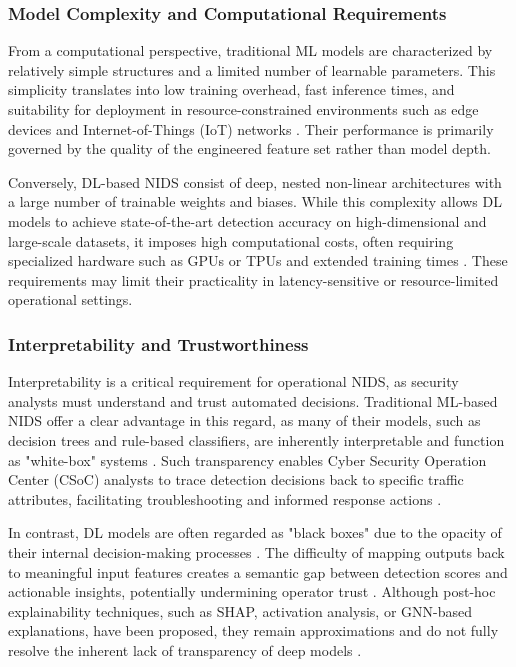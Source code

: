 \subsubsection{Model Complexity and Computational Requirements}

From a computational perspective, traditional ML models are characterized by relatively simple structures and a limited number of learnable parameters. This simplicity translates into low training overhead, fast inference times, and suitability for deployment in resource-constrained environments such as edge devices and Internet-of-Things (IoT) networks \cite{md2025guardians}. Their performance is primarily governed by the quality of the engineered feature set rather than model depth.

Conversely, DL-based NIDS consist of deep, nested non-linear architectures with a large number of trainable weights and biases. While this complexity allows DL models to achieve state-of-the-art detection accuracy on high-dimensional and large-scale datasets, it imposes high computational costs, often requiring specialized hardware such as GPUs or TPUs and extended training times \cite{doriguzzi2020lucid, abou2020investigating}. These requirements may limit their practicality in latency-sensitive or resource-limited operational settings.

\subsubsection{Interpretability and Trustworthiness}

Interpretability is a critical requirement for operational NIDS, as security analysts must understand and trust automated decisions. 
Traditional ML-based NIDS offer a clear advantage in this regard, as many of their models, such as decision trees and rule-based classifiers, are inherently interpretable and function as "white-box" systems \cite{neupane2022explainable}. 
Such transparency enables Cyber Security Operation Center (CSoC) analysts to trace detection decisions back to specific traffic attributes, facilitating troubleshooting and informed response actions \cite{vitorino2025reliable}.

In contrast, DL models are often regarded as "black boxes" due to the opacity of their internal decision-making processes \cite{zhang2022adversarial}. 
The difficulty of mapping outputs back to meaningful input features creates a semantic gap between detection scores and actionable insights, potentially undermining operator trust \cite{wei2023xnids}. 
Although post-hoc explainability techniques, such as SHAP, activation analysis, or GNN-based explanations, have been proposed, they remain approximations and do not fully resolve the inherent lack of transparency of deep models \cite{sun2024gnn}.

